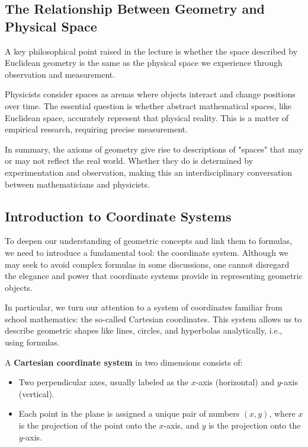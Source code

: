\documentclass[12pt,a4paper]{article}
\newenvironment{defbox}[1][]{%
  \begin{tcolorbox}[enhanced, breakable, colback=defcolor, colframe=green!50!black, title=#1, fonttitle=\bfseries, arc=3pt, boxrule=0.5pt]
}{\end{tcolorbox}}
\newenvironment{rembox}[1][]{%
  \begin{tcolorbox}[enhanced, breakable, colback=gray!5, colframe=gray!50, title=#1, fonttitle=\bfseries, arc=3pt, boxrule=0.5pt]
}{\end{tcolorbox}}
\begin{document}
\subsection{The Relationship Between Geometry and Physical Space}
A key philosophical point raised in the lecture is whether the space described by Euclidean geometry is the same as the physical space we experience through observation and measurement. 

\begin{rembox}[Geometry vs. Physical Space]
Physicists consider spaces as arenas where objects interact and change positions over time. The essential question is whether abstract mathematical spaces, like Euclidean space, accurately represent that physical reality. This is a matter of empirical research, requiring precise measurement.
\end{rembox}

In summary, the axioms of geometry give rise to descriptions of "spaces" that may or may not reflect the real world. Whether they do is determined by experimentation and observation, making this an interdisciplinary conversation between mathematicians and physicists.
\subsection{Introduction to Coordinate Systems}
To deepen our understanding of geometric concepts and link them to formulas, we need to introduce a fundamental tool: the coordinate system. Although we may seek to avoid complex formulas in some discussions, one cannot disregard the elegance and power that coordinate systems provide in representing geometric objects.

In particular, we turn our attention to a system of coordinates familiar from school mathematics: the so-called Cartesian coordinates. This system allows us to describe geometric shapes like lines, circles, and hyperbolas analytically, i.e., using formulas.

\begin{defbox}[Cartesian Coordinates]
A \textbf{Cartesian coordinate system} in two dimensions consists of:
\begin{itemize}
    \item Two perpendicular axes, usually labeled as the $x$-axis (horizontal) and $y$-axis (vertical).
    \item Each point in the plane is assigned a unique pair of numbers $(x, y)$, where $x$ is the projection of the point onto the $x$-axis, and $y$ is the projection onto the $y$-axis.
\end{itemize}
\end{defbox}
\end{document}
